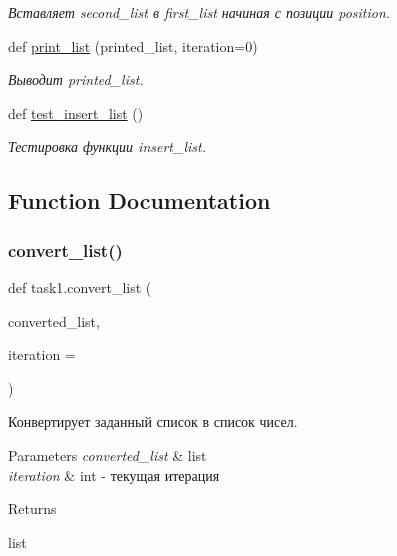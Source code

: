 \begin{DoxyCompactItemize}
\begin{DoxyCompactList}\small\item\em Вставляет second\+\_\+list в first\+\_\+list начиная с позиции position. \end{DoxyCompactList}\item 
def \hyperlink{namespacetask1_acd7e027a601d75cec619047125864296}{print\+\_\+list} (printed\+\_\+list, iteration=0)
\begin{DoxyCompactList}\small\item\em Выводит printed\+\_\+list. \end{DoxyCompactList}\item 
def \hyperlink{namespacetask1_abf46b9cd1caf7517428f67ea6e3fd856}{test\+\_\+insert\+\_\+list} ()
\begin{DoxyCompactList}\small\item\em Тестировка функции insert\+\_\+list. \end{DoxyCompactList}\end{DoxyCompactItemize}


\subsection{Function Documentation}
\mbox{\label{namespacetask1_a06a145e81c9e92a7ea7a34f0dbc3f564}} 
\subsubsection{\texorpdfstring{convert\+\_\+list()}{convert\_list()}}
{\footnotesize\ttfamily def task1.\+convert\+\_\+list (\begin{DoxyParamCaption}\item[{}]{converted\+\_\+list,  }\item[{}]{iteration = {} }\end{DoxyParamCaption})}



Конвертирует заданный список в список чисел. 


\begin{DoxyParams}{Parameters}
{\em converted\+\_\+list} & list \\
\hline
{\em iteration} & int -\/ текущая итерация\\
\hline
\end{DoxyParams}
\begin{DoxyReturn}{Returns}


list 
\end{DoxyReturn}
\mbox{\label{namespacetask1_a5480bbc141bb9daea9115381cf91f976}} 
